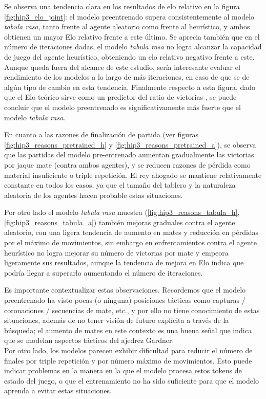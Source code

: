 \documentclass[12pt, a4paper]{article}
\let\cite\supercite
\begin{document}
Se observa una tendencia clara en los resultados de elo relativo en la figura \ref{fig:hip3_elo_joint}: el modelo preentrenado supera consistentemente al modelo \textit{tabula rasa}, tanto frente al agente aleatorio como frente al heurístico, y ambos obtienen un mayor Elo relativo frente a este último. Se aprecia también que en el número de iteraciones dadas, el modelo \textit{tabula rasa} no logra alcanzar la capacidad de juego del agente heurístico, obteniendo un elo relativo negativo frente a este. Aunque queda fuera del alcance de este estudio, sería interesante evaluar el rendimiento de los modelos a lo largo de más iteraciones, en caso de que se de algún tipo de cambio en esta tendencia.
Finalmente respecto a esta figura, dado que el Elo teórico sirve como un predictor del ratio de victorias \cite{chessbase_elo}, se puede concluir que el modelo preentrenado es significativamente más fuerte que el modelo \textit{tabula rasa}. 

En cuanto a las razones de finalización de partida (ver figuras \ref{fig:hip3_reasons_pretrained_h} y \ref{fig:hip3_reasons_pretrained_a}), se observa que las partidas del modelo pre-entrenado aumentan gradualmente las victorias por jaque mate (contra ambos agentes), y se reducen razones de pérdida como material insuficiente o triple repetición. El rey ahogado se mantiene relativamente constante en todos los casos, ya que el tamaño del tablero y la naturaleza aleatoria de los agentes hacen probable estas situaciones.

Por otro lado el modelo \textit{tabula rasa} muestra (\ref{fig:hip3_reasons_tabula_h}, \ref{fig:hip3_reasons_tabula_a}) también mejoras graduales contra el agente aleatorio, con una ligera tendencia de aumento en mates y reducción en pérdidas por el máximo de movimientos, sin embargo en enfrentamientos contra el agente heurístico no logra mejorar su número de victorias por mate y empeora ligeramente sus resultados, aunque la tendencia de mejora en Elo indica que podría llegar a superarlo aumentando el número de iteraciones.

Es importante contextualizar estas observaciones. Recordemos que el modelo preentrenado ha visto pocas (o ninguna) posiciones tácticas como capturas / coronaciones / secuencias de mate, etc., y por ello no tiene conocimiento de estas situaciones, además de no tener visión de futuro explícita a través de la búsqueda; el aumento de mates en este contexto es una buena señal que indica que se modelan aspectos tácticos del ajedrez Gardner. \\
Por otro lado, los modelos parecen exhibir dificultad para reducir el número de finales por triple repetición y por número máximo de movimientos. Esto puede indicar problemas en la manera en la que el modelo procesa estos tokens de estado del juego, o que el entrenamiento no ha sido suficiente para que el modelo aprenda a evitar estas situaciones.
\end{document}
